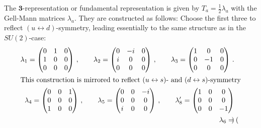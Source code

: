 The $\mathbf{3}$-representation or fundamental representation is given by $T_a=\frac{1}{2}\lambda_a$ with the Gell-Mann matrices $\lambda_a$. They are constructed as follows: Choose the first three to reflect ${(u\leftrightarrow d)}$-symmetry, leading essentially to the same structure as in the $SU(2)$-case:
\begin{subequations}
    \begin{align}
        \lambda_1=\begin{pmatrix}
            0 & 1 & 0 \\
            1 & 0 & 0 \\
            0 & 0 & 0
        \end{pmatrix}\,,\qquad
        \lambda_2=\begin{pmatrix}
            0      & -{i} & 0 \\
            {i} & 0       & 0 \\
            0      & 0       & 0
        \end{pmatrix}\,,\qquad
        \lambda_3=\begin{pmatrix}
            1 & 0  & 0 \\
            0 & -1 & 0 \\
            0 & 0  & 0
        \end{pmatrix}\,.        \\
        \intertext{This construction is mirrored to reflect ${(u\leftrightarrow s)}$- and ${(d\leftrightarrow s)}$-symmetry}
        \lambda_4=\begin{pmatrix}
            0 & 0 & 1 \\
            0 & 0 & 0 \\
            1 & 0 & 0
        \end{pmatrix}\,,\qquad
        \lambda_5=\begin{pmatrix}
            0      & 0 & -{i} \\
            0      & 0 & 0       \\
            {i} & 0 & 0       \\
        \end{pmatrix}\,,\qquad
        \lambda_8^\prime=\begin{pmatrix}
            1 & 0 & 0  \\
            0 & 0 & 0  \\
            0 & 0 & -1
        \end{pmatrix} \\
        \lambda_6=\begin{pmatrix}

\end{pmatrix}
\end{align}
\end{subequations}
